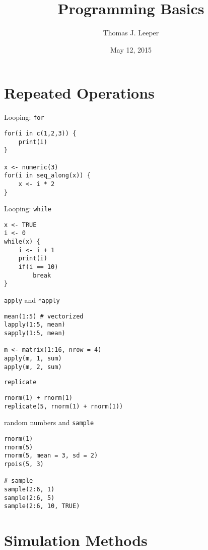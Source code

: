 \documentclass[a4paper,12pt]{article}
\title{Programming Basics}
\author{Thomas J. Leeper}
\date{May 12, 2015}
\begin{document}
\maketitle

\doublespacing


\clearpage
\section{Repeated Operations}

Looping: \texttt{for}

\begin{lstlisting}
for(i in c(1,2,3)) {
    print(i)
}

x <- numeric(3)
for(i in seq_along(x)) {
    x <- i * 2
}
\end{lstlisting}



Looping: \texttt{while}

\begin{lstlisting}
x <- TRUE
i <- 0
while(x) {
    i <- i + 1
    print(i)
    if(i == 10)
        break
}
\end{lstlisting}


\texttt{apply} and \texttt{*apply}


\begin{lstlisting}
mean(1:5) # vectorized
lapply(1:5, mean)
sapply(1:5, mean)

m <- matrix(1:16, nrow = 4)
apply(m, 1, sum)
apply(m, 2, sum)
\end{lstlisting}


\texttt{replicate}

\begin{lstlisting}
rnorm(1) + rnorm(1)
replicate(5, rnorm(1) + rnorm(1))
\end{lstlisting}



random numbers and \texttt{sample}

\begin{lstlisting}
rnorm(1)
rnorm(5)
rnorm(5, mean = 3, sd = 2)
rpois(5, 3)

# sample
sample(2:6, 1)
sample(2:6, 5)
sample(2:6, 10, TRUE)
\end{lstlisting}



\clearpage
\section{Simulation Methods}
\end{document}
